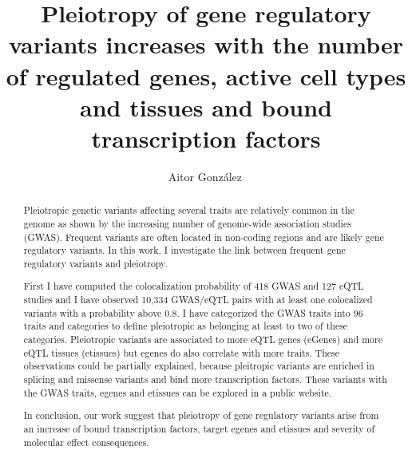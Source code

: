 
\title{Pleiotropy of gene regulatory variants increases with the number of regulated genes, active cell types and tissues and bound transcription factors}

\author[1,*]{Aitor González\,}

\date{}

\maketitle

\begin{abstract}

Pleiotropic genetic variants affecting several traits are relatively common in the genome as shown by the increasing number of genome-wide association studies (GWAS).
%
Frequent variants are often located in non-coding regions and are likely gene regulatory variants.
%
In this work, I investigate the link between frequent gene regulatory variants and pleiotropy.

First I have computed the colocalization probability of 418 GWAS and 127 eQTL studies and I have observed 10,334 GWAS/eQTL pairs with at least one colocalized variants with a probability above 0.8.
%
I have categorized the GWAS traits into 96 traits and categories to define pleiotropic as belonging at least to two of these categories.
%
Pleiotropic variants are associated to more eQTL genes (eGenes) and more eQTL tissues (etissues) but egenes do also correlate with more traits.
%
These observations could be partially explained, because pleitropic variants are enriched in splicing and missense variants and bind more transcription factors.
%
These variants with the GWAS traits, egenes and etissues can be explored in a public website.

In conclusion, our work suggest that pleiotropy of gene regulatory variants arise from an increase of bound transcription factors, target egenes and etissues and severity of molecular effect consequences.

\end{abstract}



